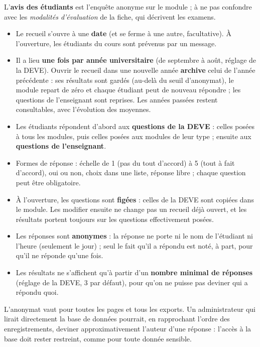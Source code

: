\documentclass[11pt,a4paper]{article}
\begin{document}
L'\textbf{avis des étudiants} est l'enquête anonyme sur le module ; à ne pas confondre avec les
\emph{modalités d'évaluation} de la fiche, qui décrivent les examens.
\begin{itemize}
  \item Le recueil s'ouvre à une \textbf{date} (et se ferme à une autre, facultative). À
    l'ouverture, les étudiants du cours sont prévenus par un message.
  \item Il a lieu \textbf{une fois par année universitaire} (de septembre à août, réglage de la
    DEVE). Ouvrir le recueil dans une nouvelle année \textbf{archive} celui de l'année
    précédente : ses résultats sont gardés (au-delà du seuil d'anonymat), le module repart de
    zéro et chaque étudiant peut de nouveau répondre ; les questions de l'enseignant sont
    reprises. Les années passées restent consultables, avec l'évolution des moyennes.
  \item Les étudiants répondent d'abord aux \textbf{questions de la DEVE} : celles posées à
    tous les modules, puis celles posées aux modules de leur type ; ensuite aux
    \textbf{questions de l'enseignant}.
  \item Formes de réponse : échelle de 1 (pas du tout d'accord) à 5 (tout à fait d'accord),
    oui ou non, choix dans une liste, réponse libre ; chaque question peut être obligatoire.
  \item À l'ouverture, les questions sont \textbf{figées} : celles de la DEVE sont copiées dans
    le module. Les modifier ensuite ne change pas un recueil déjà ouvert, et les résultats
    portent toujours sur les questions effectivement posées.
  \item Les réponses sont \textbf{anonymes} : la réponse ne porte ni le nom de l'étudiant ni
    l'heure (seulement le jour) ; seul le fait qu'il a répondu est noté, à part, pour qu'il ne
    réponde qu'une fois.
  \item Les résultats ne s'affichent qu'à partir d'un \textbf{nombre minimal de réponses}
    (réglage de la DEVE, 3 par défaut), pour qu'on ne puisse pas deviner qui a répondu quoi.
\end{itemize}

\begin{attention}
L'anonymat vaut pour toutes les pages et tous les exports. Un administrateur qui lirait
directement la base de données pourrait, en rapprochant l'ordre des enregistrements, deviner
approximativement l'auteur d'une réponse : l'accès à la base doit rester restreint, comme pour
toute donnée sensible.
\end{attention}
\end{document}
